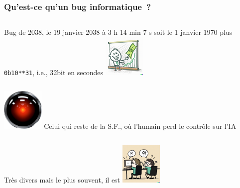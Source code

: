 \documentclass{beamer}
\begin{document}
    \begin{frame}
        \transdissolve
        \frametitle{Qu'est-ce qu'un bug informatique~?}
        \begin{columns}
            Bug de 2038, le 19 janvier 2038 à 3 h 14 min 7 s soit le 1 janvier 1970 plus \lstinline{0b10**31}, i.e., 32bit en secondes
            \centering
            \includegraphics[width=2cm]{image/bug-business}
        \end{columns}
        \begin{columns}
            \centering
            \includegraphics[width=2cm]{image/hall-eye.jpg}
            Celui qui reste de la S.F., où l'humain perd le contrôle sur l'IA
        \end{columns}
        \begin{columns}
            Très divers mais le plus souvent, il est 
            \centering
            \includegraphics[width=2cm]{image/working-together.png}
        \end{columns}

    \end{frame}
\end{document}
